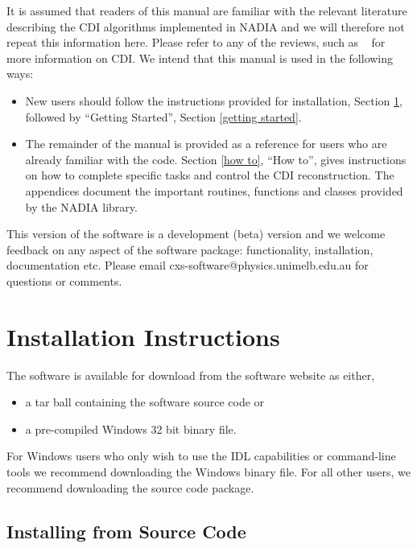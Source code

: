 \documentclass[]{nadia}
\def\name{NADIA}
\begin{document}
It is assumed that readers of this manual are familiar with the
relevant literature describing the CDI algorithms implemented in \name
and we will therefore not repeat this information here. Please refer
to any of the reviews, such as ~\cite{quiney2010coherent} for more information on CDI. We intend
that this manual is used in the following ways:
\begin{itemize}
\item New users should follow the instructions provided for
  installation, Section \ref{installation}, followed by ``Getting
  Started'', Section \ref{getting started}.
\item The remainder of the manual is provided as a reference for users
  who are already familiar with the code. Section \ref{how to}, ``How
  to'', gives instructions on how to complete specific tasks and
  control the CDI reconstruction. The appendices document the
  important routines, functions and classes provided by the \name
  library.
\end{itemize}
This version of the software is a development (beta) version and we
welcome feedback on any aspect of the software package: functionality,
installation, documentation etc. Please email
cxs-software@physics.unimelb.edu.au for questions or comments.


\newpage
\section{Installation Instructions}
\label{installation}

The software is available for download from the software website as either,
\begin{itemize}
\item a tar ball containing the software source code or
\item a pre-compiled Windows 32 bit binary file.
\end{itemize}

For Windows users who only wish to use the IDL capabilities or
command-line tools we recommend downloading the Windows binary file. For
all other users, we recommend downloading the source code package.

\subsection{Installing from Source Code}
\end{document}
